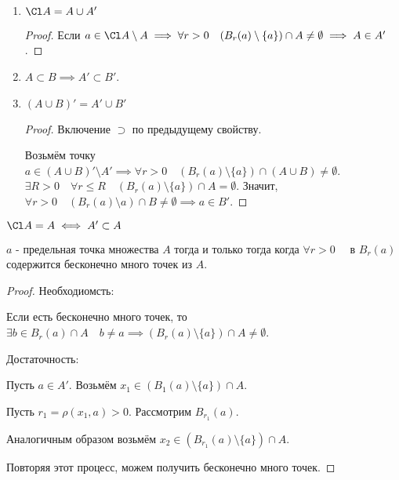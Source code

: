 \begin{properties} \thmslashn

    \begin{enumerate}
        \item $\Cl A = A \cup A'$
        \begin{proof} \thmslashn
        
            Если $a\in \Cl A \setminus A \implies \forall{r>0}\quad (B_{r}(a) \setminus \{a\}) \cap A \neq \emptyset \implies A\in A'$.
        \end{proof}
    \item $A \subset B \implies A' \subset B'$.
    \item $(A \cup B)' = A' \cup B'$
        \begin{proof} \thmslashn
        
            Включение $\supset$ по предыдущему свойству.

            Возьмём точку $a\in (A \cup B)' \setminus A' \implies \forall{r > 0}\quad (B_{r}(a) \setminus \{a\})\cap (A\cup B) \neq \emptyset $. $\exists{R > 0}\quad \forall{r \le R}\quad (B_{r}(a) \setminus \{a\})\cap A = \emptyset $. Значит, $\forall{r > 0}\quad (B_{r}(a) \setminus a)\cap B \neq \emptyset \implies a\in B'$.

        \end{proof}
    \end{enumerate}
    \item $\Cl A = A \iff A' \subset A$
\end{properties}
\begin{theorem} \thmslashn

    $a$ - предельная точка множества $A$ тогда и только тогда когда $\forall{r > 0}\quad $ в $B_{r}(a)$ содержится бесконечно много точек из $A$.
    \begin{proof} \thmslashn
    
        Необходиомсть:

            Если есть бесконечно много точек, то $\exists{b\in B_{r}(a)\cap A}\quad b \neq a \implies (B_{r}(a) \setminus \{a\})\cap A \neq \emptyset $.

        Достаточность:

        Пусть $a\in A'$. Возьмём $x_1\in (B_{1}(a) \setminus \{a\})\cap A $.

        Пусть $r_1 = \rho(x_1, a) > 0$. Рассмотрим $B_{r_1}(a)$.

        Аналогичным образом возьмём $x_2\in (B_{r_1}(a) \setminus \{a\})\cap A $.

        Повторяя этот процесс, можем получить бесконечно много точек.
    \end{proof}
\end{theorem}
